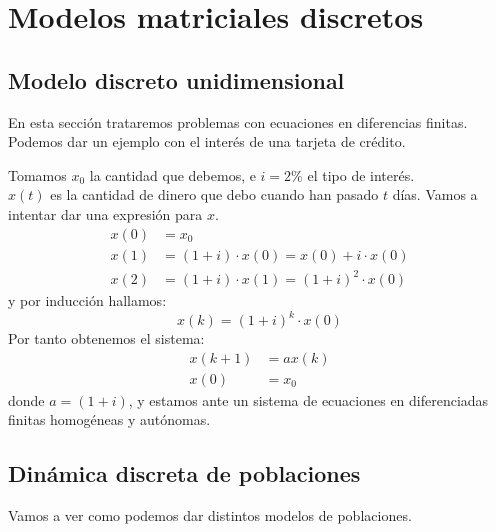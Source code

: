 
\chapter{Modelos matriciales discretos}

\section{Modelo discreto unidimensional}

En esta sección trataremos problemas con ecuaciones en diferencias finitas. Podemos dar un ejemplo con el interés de una tarjeta de crédito.

\begin{eg}
    Tomamos $x_0$ la cantidad que debemos, e $i = 2\%$ el tipo de interés.\\
    $x(t)$ es la cantidad de dinero que debo cuando han pasado $t$ días. Vamos a intentar dar una expresión para $x$.
    \begin{align*}
        x(0) &= x_0\\
        x(1) &= (1 + i)\cdot x(0) = x(0) + i \cdot x(0)\\
        x(2) &= (1+i) \cdot x(1) = (1+i)^2\cdot x(0)
    \end{align*}
    y por inducción hallamos:
    $$
        x(k) = (1+i)^{k} \cdot x(0)
    $$
    Por tanto obtenemos el sistema:
    \begin{align*}
        x(k+1) &= ax(k)\\
        x(0) &= x_0
    \end{align*}
    donde $a = (1+i)$, y estamos ante un sistema de ecuaciones en diferenciadas finitas homogéneas y autónomas.
\end{eg}

\section{Dinámica discreta de poblaciones}

Vamos a ver como podemos dar distintos modelos de poblaciones.

